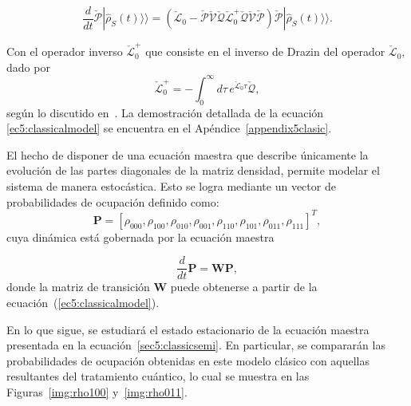 \begin{equation}
    \frac{d}{dt}\check{\mathcal{P}}|\hat{\rho}_{S}(t)\rangle \rangle = (\check{\mathcal{L}}_{0} - \check{\mathcal{P}}\check{\mathcal{V}}\check{\mathcal{Q}}\check{\mathcal{L}}^{+}_{0}\check{\mathcal{Q}}\check{\mathcal{V}}\check{\mathcal{P}})\check{\mathcal{P}}|\hat{\rho}_{S}(t)\rangle \rangle. 
\label{ec5:classicalmodel}
\end{equation}

Con el operador inverso $\check{\mathcal{L}}_{0}^{+}$ que consiste en el inverso de Drazin del operador $\check{\mathcal{L}}_{0}$, dado por 
\begin{equation*}
\check{\mathcal{L}}_{0}^{+} = -\int_{0}^{\infty} d\tau\, e^{\check{\mathcal{L}}_{0} \tau} \check{\mathcal{Q}},
\end{equation*}
según lo discutido en~\cite{landi2024current}. La demostración detallada de la ecuación \ref{ec5:classicalmodel} se encuentra en el Apéndice~\ref{appendix5clasic}.

El hecho de disponer de una ecuación maestra que describe únicamente la evolución de las partes diagonales de la matriz densidad, permite modelar el sistema de manera estocástica. Esto se logra mediante un vector de probabilidades de ocupación definido como:
\begin{equation*}
\mathbf{P} = [\rho_{000}, \rho_{100}, \rho_{010}, \rho_{001}, \rho_{110}, \rho_{101}, \rho_{011}, \rho_{111}]^{T},
\end{equation*}
cuya dinámica está gobernada por la ecuación maestra

\begin{equation}
    \frac{d}{dt}\textbf{P} = \textbf{W}\textbf{P},
    \label{sec5:classicsemi}
\end{equation}
donde la matriz de transición $\mathbf{W}$ puede obtenerse a partir de la ecuación~(\ref{ec5:classicalmodel}).

En lo que sigue, se estudiará el estado estacionario de la ecuación maestra presentada en la ecuación~\ref{sec5:classicsemi}. En particular, se compararán las probabilidades de ocupación obtenidas en este modelo clásico con aquellas resultantes del tratamiento cuántico, lo cual se muestra en las Figuras~\ref{img:rho100} y~\ref{img:rho011}. 


